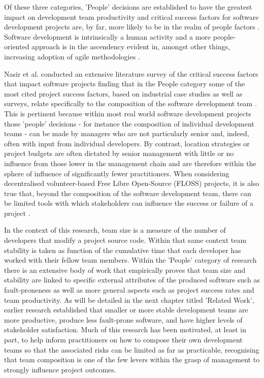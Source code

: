 Of these three categories, 'People' decisions are established to have the greatest impact on development team productivity \citep{trendowicz2009factors} and critical success factors for software development projects are, by far, more likely to be in the realm of people factors \citep{boehm1978characteristics, onoue2018human}. Software development is intrinsically a human activity and a more people-oriented approach is in the ascendency evident in, amongst other things, increasing adoption of agile methodologies \citep{pirzadeh2010human}.

Nasir et al. \citep{nasir2011critical} conducted an extensive literature survey of the critical success factors that impact software projects finding that in the People category some of the most cited project success factors, based on industrial case studies as well as surveys, relate specifically to the composition of the software development team \citep{schmidt2001identifying, sauer2003state, humphrey2005big, kappelman2006early, glass2006standish}. This is pertinent because within most real world software development projects those 'people' decisions - for instance the composition of individual development teams - can be made by managers who are not particularly senior and, indeed, often with input from individual developers. By contrast, location strategies or project budgets are often dictated by senior management with little or no influence from those lower in the management chain and are therefore within the sphere of influence of significantly fewer practitioners. When considering decentralised volunteer-based Free Libre Open-Source (FLOSS) projects, it is also true that, beyond the composition of the software development team, there can be limited tools with which stakeholders can influence the success or failure of a project \citep{schweik2008brooks}.

In the context of this research, team size is a measure of the number of developers that modify a project source code. Within that same context team stability is taken as function of the cumulative time that each developer has worked with their fellow team members. Within the 'People' category of research there is an extensive body of work that empirically proves that team size and stability are linked to specific external attributes of the produced software such as fault-proneness as well as more general aspects such as project success rates and team productivity. As will be detailed in the next chapter titled 'Related Work', earlier research established that smaller or more stable development teams are more productive, produce less fault-prone software, and have higher levels of stakeholder satisfaction.  Much of this research has been motivated, at least in part, to help inform practitioners on how to compose their own development teams so that the associated risks can be limited as far as practicable, recognising that team composition is one of the few levers within the grasp of management to strongly influence project outcomes. 

